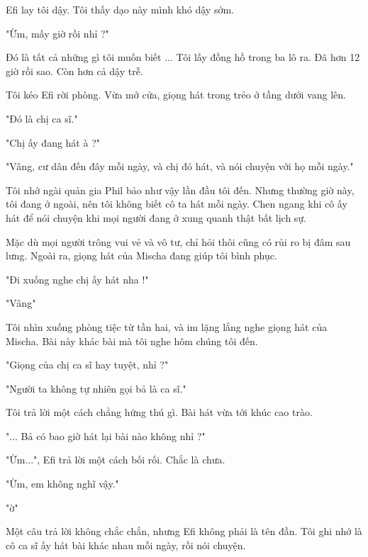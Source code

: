 
Efi lay tôi dậy. Tôi thấy dạo này mình khó dậy sớm.

"Ừm, mấy giờ rồi nhỉ ?"

Đó là tất cả những gì tôi muốn biết ... Tôi lấy đồng hồ trong ba lô ra. Đã hơn 12 giờ rồi sao. Còn hơn cả dậy trễ.

Tôi kéo Efi rời phòng. Vừa mở cửa, giọng hát trong trẻo ở tầng dưới vang lên.

"Đó là chị ca sĩ."

"Chị ấy đang hát à ?"

"Vâng, cư dân đến đây mỗi ngày, và chị đó hát, và nói chuyện với họ mỗi ngày."

Tôi nhớ ngài quản gia Phil bảo như vậy lần đầu tôi đến. Nhưng thường giờ này, tôi đang ở ngoài, nên tôi không biết cô ta hát mỗi ngày. Chen ngang khi cô ấy hát để nói chuyện khi mọi người đang ở xung quanh thật bất lịch sự. 

Mặc dù mọi người trông vui vẻ và vô tư, chỉ hỏi thôi cũng có rủi ro bị đâm sau lưng. Ngoài ra, giọng hát của Mischa đang giúp tôi bình phục.

"Đi xuống nghe chị ấy hát nha !"

"Vâng"

Tôi nhìn xuống phòng tiệc từ tần hai, và im lặng lắng nghe giọng hát của Mischa. Bài này khác bài mà tôi nghe hôm chúng tôi đến.

"Giọng của chị ca sĩ hay tuyệt, nhỉ ?"

"Người ta không tự nhiên gọi bả là ca sĩ."

Tôi trả lời một cách chẳng hứng thú gì. Bài hát vừa tới khúc cao trào.

"... Bả có bao giờ hát lại bài nào không nhỉ ?"

"Ừm...", Efi trả lời một cách bối rối. Chắc là chưa.

"Ừm, em không nghĩ vậy."

"ờ"

Một câu trả lời không chắc chắn, nhưng Efi không phải là tên đần. Tôi ghi nhớ là cô ca sĩ ấy hát bài khác nhau mỗi ngày, rồi nói chuyện. \\

